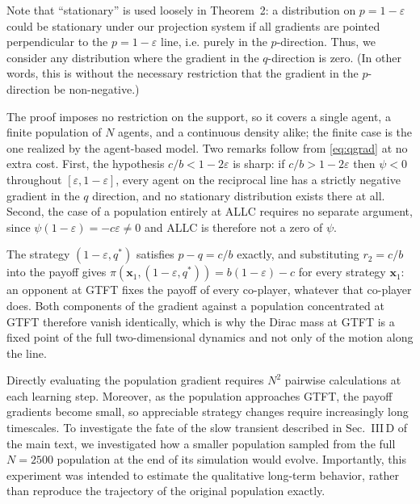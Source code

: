 \documentclass[10pt]{article}
\makeatletter
\newcommand{\eps}{\varepsilon}
\renewcommand\section{\@startsection{section}{1}{\z@}{-3ex \@plus -1ex \@minus -.2ex}{1.2ex \@plus .2ex}{\sffamily\bfseries\Large}}
\makeatother
\begin{document}
Note that ``stationary'' is used loosely in Theorem~2: a distribution on $p = 1-\eps$ could be stationary under our projection system if all gradients are pointed perpendicular to the $p = 1-\eps$ line, i.e. purely in the $p$-direction.
Thus, we consider any distribution where the gradient in the $q$-direction is zero. (In other words, this is without the necessary restriction that the gradient in the $p$-direction be non-negative.)

The proof imposes no restriction on the support, so it covers a single agent, a finite population of $N$ agents, and a continuous density alike; the finite case is the one realized by the agent-based model.
Two remarks follow from \eqref{eq:qgrad} at no extra cost.
First, the hypothesis $c/b < 1-2\eps$ is sharp: if $c/b > 1-2\eps$ then $\psi < 0$ throughout $[\eps,1-\eps]$, every agent on the reciprocal line has a strictly negative gradient in the $q$ direction, and no stationary distribution exists there at all.
Second, the case of a population entirely at ALLC requires no separate argument, since $\psi(1-\eps) = -c\eps \neq 0$ and ALLC is therefore not a zero of $\psi$.

The strategy $(1-\eps, q^{*})$ satisfies $p - q = c/b$ exactly, and substituting $r_2 = c/b$ into the payoff gives $\pi(\mathbf{x}_1, (1-\eps,q^{*})) = b(1-\eps)-c$ for every strategy $\mathbf{x}_1$: an opponent at GTFT fixes the payoff of every co-player, whatever that co-player does.
Both components of the gradient against a population concentrated at GTFT therefore vanish identically, which is why the Dirac mass at GTFT is a fixed point of the full two-dimensional dynamics and not only of the motion along the line.

\section{Long-term experiment (Fig.~\ref{fig:long_run_trajectory})}

Directly evaluating the population gradient requires $N^2$ pairwise calculations at each learning step. Moreover, as the population approaches GTFT, the payoff gradients become small, so appreciable strategy changes require increasingly long timescales. To investigate the fate of the slow transient described in Sec.~III\,D of the main text, we investigated how a smaller population sampled from the full $N = 2500$ population at the end of its simulation would evolve. Importantly, this experiment was intended to estimate the qualitative long-term behavior, rather than reproduce the trajectory of the original population exactly.
\end{document}
